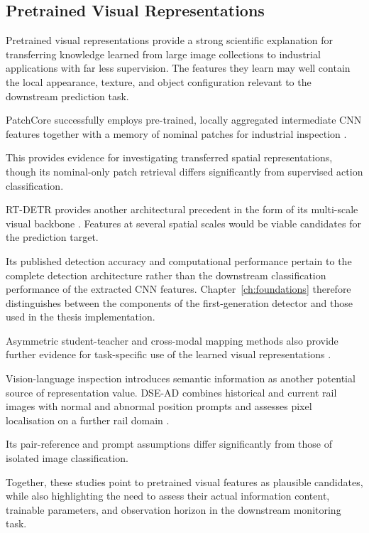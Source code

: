 \subsection{Pretrained Visual Representations}

Pretrained visual representations provide a strong scientific explanation for transferring knowledge
learned from large image collections to industrial applications with far less supervision. The
features they learn may well contain the local appearance, texture, and object configuration
relevant to the downstream prediction task.

PatchCore successfully employs pre-trained, locally aggregated intermediate CNN features together
with a memory of nominal patches for industrial inspection \parencite[Section~3]{Roth2022Towards}.

This provides evidence for investigating transferred spatial representations, though its
nominal-only patch retrieval differs significantly from supervised action classification.

RT-DETR provides another architectural precedent in the form of its multi-scale visual backbone
\parencite[Sections~4.1--4.2]{Zhao2024RTDETR}. Features at several spatial scales would be viable
candidates for the prediction target.

Its published detection accuracy and computational performance pertain to the complete detection
architecture rather than the downstream classification performance of the extracted CNN features.
Chapter~\ref{ch:foundations} therefore distinguishes between the components of the first-generation
detector and those used in the thesis implementation.

Asymmetric student-teacher and cross-modal mapping methods also provide further evidence for
task-specific use of the learned visual representations
\parencite{Rudolph2023Asymmetric,Costanzino2024Multimodal}.

Vision-language inspection introduces semantic information as another potential source of
representation value. DSE-AD combines historical and current rail images with normal and abnormal
position prompts and assesses pixel localisation on a further rail domain \parencite{P031}.

Its pair-reference and prompt assumptions differ significantly from those of isolated image
classification.

Together, these studies point to pretrained visual features as plausible candidates, while also
highlighting the need to assess their actual information content, trainable parameters, and
observation horizon in the downstream monitoring task.

